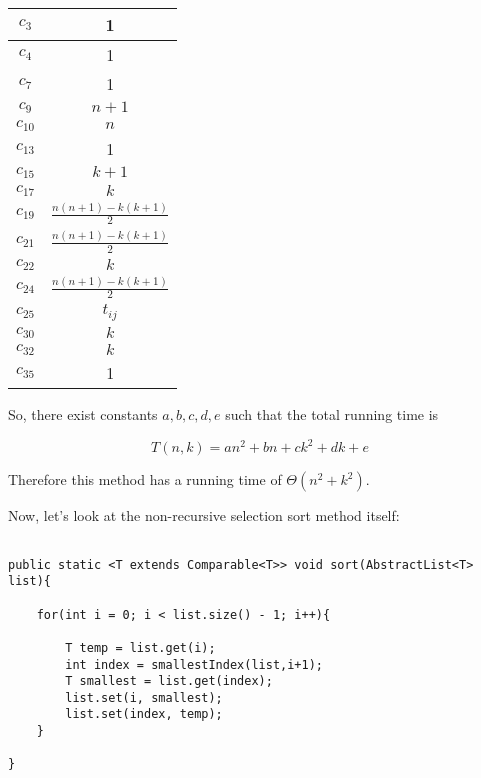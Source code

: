 \documentclass{article}
\begin{document}
\begin{tabular}{|c|c|}
\hline 
$c_3$ & 1 \\ 
\hline 
$c_4$ & 1 \\ 
\hline 
$c_7$ & 1 \\ 
\hline 
$c_9$ & $n+1$ \\ 
\hline 
$c_{10}$ & $n$ \\ 
\hline 
$c_{13}$ & 1 \\ 
\hline 
$c_{15}$ & $k+1$ \\ 
\hline 
$c_{17}$ & $k$ \\ 
\hline 
$c_{19}$ &  $\frac{n(n+1) - k(k+1)}{2}$ \\ 
\hline 
$c_{21}$ & $\frac{n(n+1) - k(k+1)}{2}$ \\ 
\hline 
$c_{22}$ & $k$ \\ 
\hline 
$c_{24}$ & $\frac{n(n+1) - k(k+1)}{2}$ \\ 
\hline 
$c_{25}$ & $t_{ij}$ \\ 
\hline 
$c_{30}$ & $k$ \\ 
\hline 
$c_{32}$ & $k$ \\ 
\hline 
$c_{35}$ & 1 \\ 
\hline 
\end{tabular} 

\bigskip
\bigskip

So, there exist constants $a,b,c,d,e$ such that the total running time is

\[
	T(n,k) = a n^2 + bn + ck^2 + dk + e
\]

Therefore this method has a running time of $\Theta(n^2 + k^2)$.

Now, let's look at the non-recursive selection sort method itself:

\begin{verbatim}

public static <T extends Comparable<T>> void sort(AbstractList<T> list){
		
	for(int i = 0; i < list.size() - 1; i++){
		
		T temp = list.get(i);
		int index = smallestIndex(list,i+1);
		T smallest = list.get(index);
		list.set(i, smallest);
		list.set(index, temp);
	}
	
}

\end{verbatim}
\end{document}
